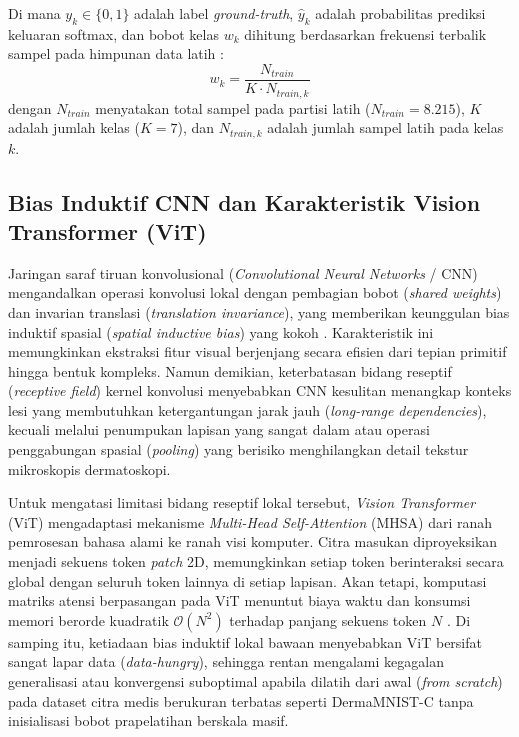 Di mana $y_k \in \{0, 1\}$ adalah label \textit{ground-truth}, $\hat{y}_k$ adalah probabilitas prediksi keluaran softmax, dan bobot kelas $w_k$ dihitung berdasarkan frekuensi terbalik sampel pada himpunan data latih \cite{cui2019classbalanced, salmi2024imbalanced}:
\begin{equation}
	w_k = \frac{N_{train}}{K \cdot N_{train, k}}
\end{equation}
dengan $N_{train}$ menyatakan total sampel pada partisi latih ($N_{train} = 8.215$), $K$ adalah jumlah kelas ($K = 7$), dan $N_{train, k}$ adalah jumlah sampel latih pada kelas $k$.

\subsection{Bias Induktif CNN dan Karakteristik Vision Transformer (ViT)} \label{II.Teori.CNN_ViT}
Jaringan saraf tiruan konvolusional (\textit{Convolutional Neural Networks} / CNN) mengandalkan operasi konvolusi lokal dengan pembagian bobot (\textit{shared weights}) dan invarian translasi (\textit{translation invariance}), yang memberikan keunggulan bias induktif spasial (\textit{spatial inductive bias}) yang kokoh \cite{litjens2017survey}. Karakteristik ini memungkinkan ekstraksi fitur visual berjenjang secara efisien dari tepian primitif hingga bentuk kompleks. Namun demikian, keterbatasan bidang reseptif (\textit{receptive field}) kernel konvolusi menyebabkan CNN kesulitan menangkap konteks lesi yang membutuhkan ketergantungan jarak jauh (\textit{long-range dependencies}), kecuali melalui penumpukan lapisan yang sangat dalam atau operasi penggabungan spasial (\textit{pooling}) yang berisiko menghilangkan detail tekstur mikroskopis dermatoskopi. \par

Untuk mengatasi limitasi bidang reseptif lokal tersebut, \textit{Vision Transformer} (ViT) \cite{dosovitskiy2021image} mengadaptasi mekanisme \textit{Multi-Head Self-Attention} (MHSA) dari ranah pemrosesan bahasa alami ke ranah visi komputer. Citra masukan diproyeksikan menjadi sekuens token \textit{patch} 2D, memungkinkan setiap token berinteraksi secara global dengan seluruh token lainnya di setiap lapisan. Akan tetapi, komputasi matriks atensi berpasangan pada ViT menuntut biaya waktu dan konsumsi memori berorde kuadratik $\mathcal{O}(N^2)$ terhadap panjang sekuens token $N$ \cite{amangeldi2025cnn}. Di samping itu, ketiadaan bias induktif lokal bawaan menyebabkan ViT bersifat sangat lapar data (\textit{data-hungry}), sehingga rentan mengalami kegagalan generalisasi atau konvergensi suboptimal apabila dilatih dari awal (\textit{from scratch}) pada dataset citra medis berukuran terbatas seperti DermaMNIST-C tanpa inisialisasi bobot prapelatihan berskala masif. \par

